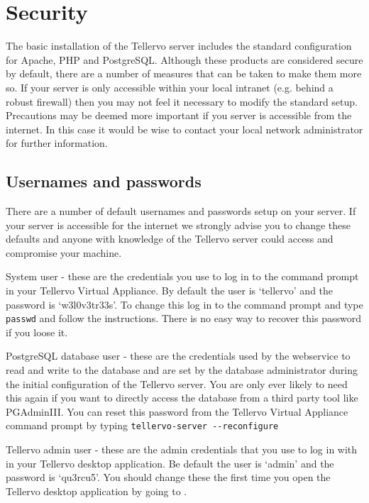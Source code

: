 
\section{Security}
The basic installation of the Tellervo server includes the standard configuration for Apache, PHP and PostgreSQL.  Although these products are considered secure by default, there are a number of measures that can be taken to make them more so.  If your server is only accessible within your local intranet (e.g. behind a robust firewall) then you may not feel it necessary to modify the standard setup.  Precautions may be deemed more important if you server is accessible from the internet.  In this case it would be wise to contact your local network administrator for further information.

\subsection{Usernames and passwords}
\label{txt:passwords}
There are a number of default usernames and passwords setup on your server.  If your server is accessible for the internet we strongly advise you to change these defaults and anyone with knowledge of the Tellervo server could access and compromise your machine.

\begin{description*}
 \item[System user] - these are the credentials you use to log in to the command prompt in your Tellervo Virtual Appliance.  By default the user is `tellervo' and the password is `w3l0v3tr33s'.  To change this log in to the command prompt and type \verb|passwd| and follow the instructions.  There is no easy way to recover this password if you loose it.
 \item[PostgreSQL database user] - these are the credentials used by the webservice to read and write to the database and are set by the database administrator during the initial configuration of the Tellervo server. You are only ever likely to need this again if you want to directly access the database from a third party tool like PGAdminIII.  You can reset this password from the Tellervo Virtual Appliance command prompt by typing \verb|tellervo-server --reconfigure|
 \item[Tellervo admin user] - these are the admin credentials that you use to log in with in your Tellervo desktop application.  Be default the user is `admin' and the password is `qu3rcu5'.  You should change these the first time you open the Tellervo desktop application by going to .
\end{description*}

